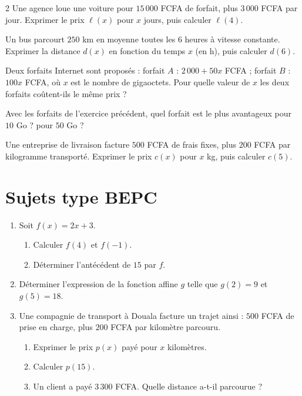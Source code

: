 \begin{multicols}{2}
\exo{} Une agence loue une voiture pour $15\,000$ FCFA de forfait, plus $3\,000$
FCFA par jour. Exprimer le prix $\ell(x)$ pour $x$ jours, puis calculer $\ell(4)$.

\exo{} Un bus parcourt $250$ km en moyenne toutes les $6$ heures à vitesse
constante. Exprimer la distance $d(x)$ en fonction du temps $x$ (en h), puis calculer $d(6)$.

\exo{} Deux forfaits Internet sont proposés : forfait $A$ : $2\,000+50x$ FCFA ;
forfait $B$ : $100x$ FCFA, où $x$ est le nombre de gigaoctets. Pour quelle valeur de $x$
les deux forfaits coûtent-ils le même prix ?

\exo{} Avec les forfaits de l'exercice précédent, quel forfait est le plus
avantageux pour $10$ Go ? pour $50$ Go ?

\exo{} Une entreprise de livraison facture $500$ FCFA de frais fixes, plus $200$
FCFA par kilogramme transporté. Exprimer le prix $c(x)$ pour $x$ kg, puis calculer $c(5)$.

\end{multicols}

\section{Sujets type BEPC}

\begin{enumerate}[label=\arabic*)]
\item Soit $f(x)=2x+3$.
\begin{enumerate}[label=\alph*)]
\item Calculer $f(4)$ et $f(-1)$.
\item Déterminer l'antécédent de $15$ par $f$.
\end{enumerate}
\item Déterminer l'expression de la fonction affine $g$ telle que $g(2)=9$ et $g(5)=18$.
\item Une compagnie de transport à Douala facture un trajet ainsi : $500$ FCFA de prise en
charge, plus $200$ FCFA par kilomètre parcouru.
\begin{enumerate}[label=\alph*)]
\item Exprimer le prix $p(x)$ payé pour $x$ kilomètres.
\item Calculer $p(15)$.
\item Un client a payé $3\,300$ FCFA. Quelle distance a-t-il parcourue ?
\end{enumerate}
\end{enumerate}

